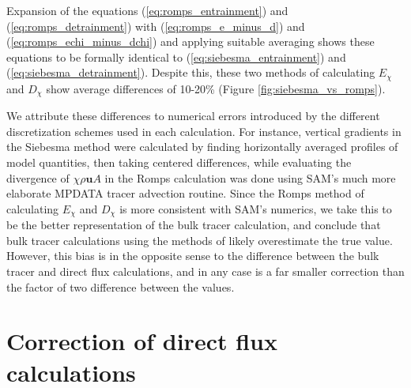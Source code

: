 \documentclass[draft,grl]{agutex}
\begin{document}
\begin{article}
Expansion of the equations (\ref{eq:romps_entrainment}) and 
(\ref{eq:romps_detrainment}) with (\ref{eq:romps_e_minus_d}) and 
(\ref{eq:romps_echi_minus_dchi}) and applying suitable averaging shows these 
equations to be formally identical to (\ref{eq:siebesma_entrainment}) and 
(\ref{eq:siebesma_detrainment}).  Despite this, these two methods of 
calculating $E_{\chi}$ and $D_{\chi}$ show average differences of 10-20\% 
(Figure \ref{fig:siebesma_vs_romps}).

We attribute these differences to numerical errors introduced by the 
different discretization schemes used in each calculation.  For instance, 
vertical gradients in the Siebesma method were calculated by finding 
horizontally averaged profiles of model quantities, then taking centered 
differences, while evaluating the divergence of $\chi \rho \mathbf{u} A$ in 
the Romps calculation was done using SAM's much more elaborate MPDATA tracer 
advection routine.  Since the Romps method of calculating $E_{\chi}$ and 
$D_{\chi}$ is more consistent with SAM's numerics, we take this to be the 
better representation of the bulk tracer calculation, and conclude that 
bulk tracer calculations using the methods of \cite{Siebesma1995} likely 
overestimate the true value.  However, this bias is in the opposite sense to 
the difference between the bulk tracer and direct flux calculations, and in 
any case is a far smaller correction than the factor of two difference between
the values.


\section{Correction of direct flux calculations}


\end{article}
\end{document}
